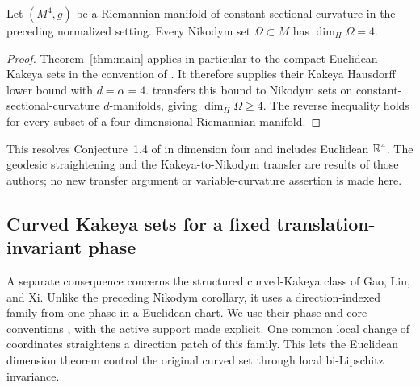 \begin{corollary}
\label{cor:nikodym-four}
Let \((M^4,g)\) be a Riemannian manifold of constant sectional
curvature in the preceding normalized setting. Every Nikodym set
\(\Omega\subset M\) has \(\dim_H\Omega=4\).
\end{corollary}
\begin{proof}
Theorem~\ref{thm:main} applies in particular to the compact Euclidean
Kakeya sets in the convention of
\citet[Definition~1.1]{GaoLiuXi2025}. It therefore supplies their
Kakeya Hausdorff lower bound with \(d=\alpha=4\).
\citet[Theorem~1.5]{GaoLiuXi2025} transfers this bound to Nikodym sets
on constant-sectional-curvature \(d\)-manifolds, giving
\(\dim_H\Omega\ge4\). The reverse inequality holds for every subset
of a four-dimensional Riemannian manifold.
\end{proof}

This resolves Conjecture~1.4 of \citet{GaoLiuXi2025} in dimension
four and includes Euclidean \(\mathbb R^4\). The geodesic straightening and
the Kakeya-to-Nikodym transfer are results of those authors; no new
transfer argument or variable-curvature assertion is made here.

\subsection{Curved Kakeya sets for a fixed translation-invariant phase}
\label{subsec:curved-kakeya-four}

A separate consequence concerns the structured curved-Kakeya class of
Gao, Liu, and Xi. Unlike the preceding Nikodym corollary, it uses a
direction-indexed family from one phase in a Euclidean chart. We use
their phase and core conventions
\citep[Definitions~1.7--1.11]{GaoLiuXi2025}, with the active support
made explicit.
One common local change of coordinates straightens a direction patch
of this family. This lets the Euclidean dimension theorem control the
original curved set through local bi-Lipschitz invariance.

